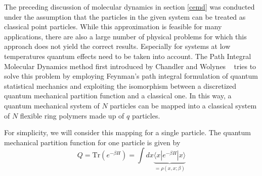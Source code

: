 The preceding discussion of molecular dynamics in section \ref{cemd} was conducted under the assumption that the particles in the given system can be treated as classical point particles. While this approximation is feasible for many applications, there are also a large number of physical problems for which this approach does not yield the correct results. Especially for systems at low temperatures quantum effects need to be taken into account. The Path Integral Molecular Dynamics method first introduced by Chandler and Wolynes ~\cite{Chandler1980} tries to solve this problem by employing Feynman's path integral formulation of quantum statistical mechanics and exploiting the isomorphism between a discretized quantum mechanical partition function and a classical one. In this way, a quantum mechanical system of $N$ particles can be mapped into a classical system of $N$ flexible ring polymers made up of $q$ particles. 

For simplicity, we will consider this mapping for a single particle. The quantum mechanical partition function for one particle is given by 
\begin{equation}
Q = \text{Tr}\left(e^{-\beta H}\right) = \int dx \underbrace{\langle x | e^{-\beta H} | x \rangle}_{=\rho(x, x; \beta)}
\end{equation}

